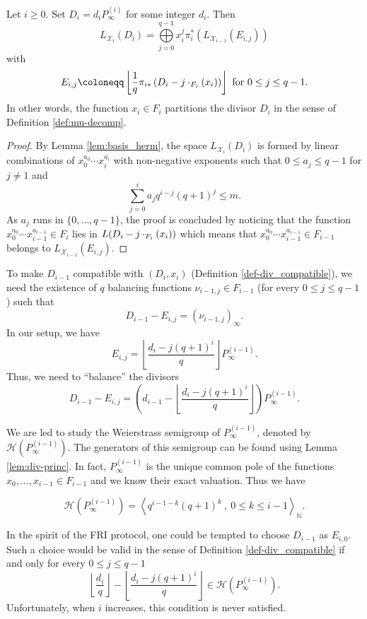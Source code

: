 \documentclass[a4paper,USenglish,autoref]{lipics-v2021}
\newcommand\N{\mathbb{N}}
\let\div\relax\DeclareMathOperator{\div}{div}
\newcommand\calX{\mathcal{X}}
\newcommand\calH{\mathcal{H}}
\newcommand\mydef{\coloneqq}
\begin{document}
\begin{proposition} 
	Let $i \geq 0$. Set $D_i = d_iP^{(i)}_{\infty}$ for some integer $d_i$. Then
	\[L_{\calX_i}(D_i) = \bigoplus\limits_{j=0}^{q-1} x_i^j \pi_i^*\left(L_{\calX_{i-1}}(E_{i,j})\right)\]
	with
	\[E_{i,j} \mydef \left\lfloor \frac{1}{q} \pi_{i*}\left(D_i-j\cdot \div_{F_i}(x_i)\right)\right\rfloor \text{ for } 0 \leq j \leq q-1.\]
	In other words, the function $x_i \in F_i$ partitions the divisor $D_i$ in the sense of Definition \ref{def:mu-decomp}.
\end{proposition}

\begin{proof}
	By Lemma \ref{lem:basis_herm}, the space $L_{\calX_i}(D_i)$ is formed by linear combinations of $x_0^{a_0} \cdots x_i^{a_i}$ with non-negative exponents  such that $0 \leq a_j \leq q-1$ for $j\neq 1$ and \[\sum\limits_{j=0}^i a_jq^{i-j}(q+1)^j \leq m.\] As $a_j$ runs in $\{0,\dots,q-1\}$, the proof is concluded by noticing that the function $x_0^{a_0} \cdots x_{i-1}^{a_{i-1}} \in F_{i}$ lies in $L(D_i-j\cdot\div_{F_i}(x_i))$ which means that $x_0^{a_0} \cdots x_{i-1}^{a_{i-1}} \in F_{i-1}$ belongs to $L_{\calX_{i-1}}(E_{i,j})$.
	
\end{proof}

To make $D_{i-1}$ compatible with $(D_i,x_i)$ (Definition \ref{def-div_compatible}), we need the existence of $q$ balancing functions  $\nu_{i-1,j} \in F_{i-1}$ (for every  $0 \leq j \leq q-1$) such that 
\begin{equation}\label{eq:balancing_fct_herm}
	D_{i-1}-E_{i,j} = (\nu_{i-1,j})_{\infty}.
\end{equation}
In our setup, we have
\[E_{i,j} = \left\lfloor \dfrac{d_i-j(q+1)^i}{q}\right\rfloor P^{(i-1)}_{\infty}.\]
Thus, we need to ``balance'' the divisors
\[D_{i-1}-E_{i,j} = \left(d_{i-1}- \left\lfloor \dfrac{d_i-j(q+1)^i}{q}\right\rfloor\right) P^{(i-1)}_{\infty}.\]


We are led to study the Weierstrass semigroup of $P^{(i-1)}_{\infty}$, denoted by $\calH\left(P^{(i-1)}_{\infty}\right)$. The generators of this semigroup can be found using Lemma \ref{lem:div-princ}. In fact, $P_{\infty}^{(i-1)}$ is the unique common pole of the functions $x_0,...,x_{i-1} \in 
F_{i-1}$ and we know their exact valuation. Thus we have

\[\calH\left(P^{(i-1)}_{\infty}\right) = \left \langle q^{i-1-k}(q+1)^k \ , \ 0\leq k \leq i-1 \right\rangle_{\N}.\]

\begin{remark}\label{rk:big-div-HT}
	In the spirit of the \textsf{FRI} protocol, one could be tempted to choose $D_{i-1}$ as $E_{i,0}$. Such a choice would be valid in the sense of Definition \ref{def-div_compatible} if and only for every $0 \leq j \leq q-1$
	\[ \left\lfloor \dfrac{d_i}{q} \right\rfloor - \left\lfloor \dfrac{d_i-j(q+1)^i}{q}\right\rfloor \in \calH\left(P^{(i-1)}_{\infty}\right).\]
	Unfortunately, when $i$ increases, this condition is never satisfied.
\end{remark}
\end{document}
